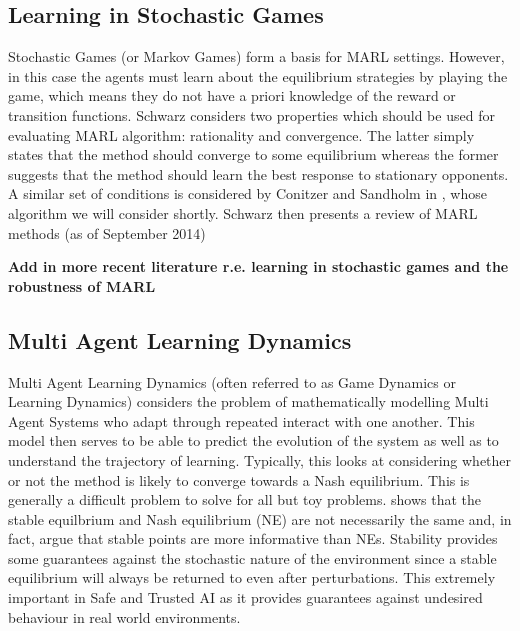 \documentclass[.../main.tex]{subfiles}
\begin{document}
\subsection{Learning in Stochastic Games} \label{sec::Learning_Stochastic_Games}

Stochastic Games (or Markov Games) form a basis for MARL settings. However, in this case the agents
must learn about the equilibrium strategies by playing the game, which means they do not have a
priori knowledge of the reward or transition functions. Schwarz considers two properties which
should be used for evaluating MARL algorithm: rationality and convergence. The latter simply states
that the method should converge to some equilibrium whereas the former suggests that the method
should learn the best response to stationary opponents. A similar set of conditions is considered by
Conitzer and Sandholm in \cite{ConitzerAWESOME:}, whose algorithm we will consider shortly. Schwarz
then presents a review of MARL methods (as of September 2014)

\textbf{Add in more recent literature r.e. learning in stochastic games and the robustness of MARL}

\subsection{Multi Agent Learning Dynamics} \label{sec::MARL_Dynamics}

Multi Agent Learning Dynamics (often referred to as Game Dynamics or Learning Dynamics)
considers the
problem of mathematically modelling Multi Agent Systems who adapt through repeated interact with one
another. This model then serves to be able to predict the evolution of the system as well as to
understand the trajectory of learning. Typically, this looks at considering whether or not the
method is likely to converge towards a Nash equilibrium. This is generally a difficult problem to
solve \cite{ShohamMultiagentFoundations} for all but toy problems.
\cite{Letcher2019DifferentiableMechanics} shows that the stable equilbrium and Nash equilibrium (NE)
are not necessarily the same and, in fact, argue that stable points are more informative than NEs.
Stability provides some guarantees against the stochastic nature of the environment since a stable
equilibrium will always be returned to even after perturbations. This extremely important in Safe
and Trusted AI as it provides guarantees against undesired behaviour in real world environments.
\end{document}
